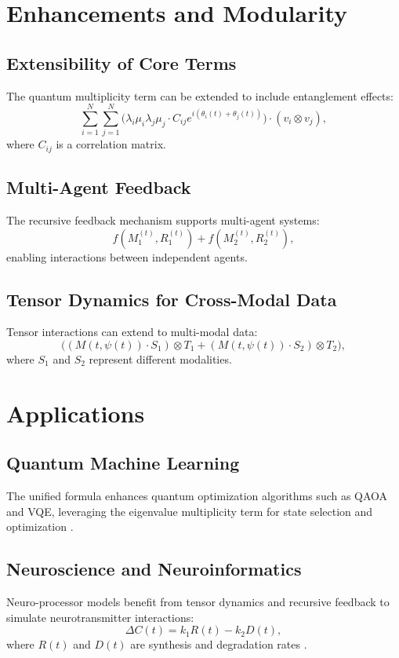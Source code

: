 \documentclass{article}
\theoremstyle{plain}
\begin{document}
\section{Enhancements and Modularity}

\subsection{Extensibility of Core Terms}
The quantum multiplicity term can be extended to include entanglement effects:
\begin{equation}
    \sum_{i=1}^N \sum_{j=1}^N \big(\lambda_i \mu_i \lambda_j \mu_j \cdot C_{ij} e^{i (\theta_i(t) + \theta_j(t))} \big) \cdot (v_i \otimes v_j),
\end{equation}
where \(C_{ij}\) is a correlation matrix.

\subsection{Multi-Agent Feedback}
The recursive feedback mechanism supports multi-agent systems:
\begin{equation}
    f(M_1^{(t)}, R_1^{(t)}) + f(M_2^{(t)}, R_2^{(t)}),
\end{equation}
enabling interactions between independent agents.

\subsection{Tensor Dynamics for Cross-Modal Data}
Tensor interactions can extend to multi-modal data:
\begin{equation}
    \Big((M(t, \psi(t)) \cdot S_1) \otimes T_1 + (M(t, \psi(t)) \cdot S_2) \otimes T_2 \Big),
\end{equation}
where \(S_1\) and \(S_2\) represent different modalities.

\section{Applications}

\subsection{Quantum Machine Learning}
The unified formula enhances quantum optimization algorithms such as QAOA and VQE, leveraging the eigenvalue multiplicity term for state selection and optimization \cite{schuld2019quantum}.

\subsection{Neuroscience and Neuroinformatics}
Neuro-processor models benefit from tensor dynamics and recursive feedback to simulate neurotransmitter interactions:
\begin{equation}
    \Delta C(t) = k_1 R(t) - k_2 D(t),
\end{equation}
where \(R(t)\) and \(D(t)\) are synthesis and degradation rates \cite{carhart1998computational}.
\end{document}
